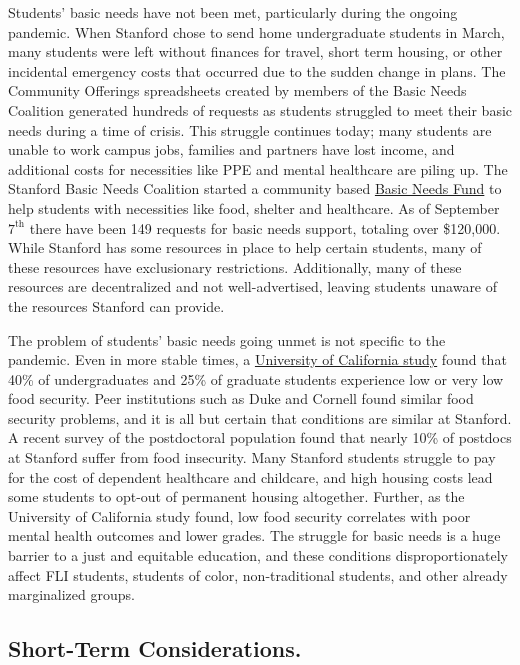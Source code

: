 \documentclass[12pt, titlepage, letterpaper]{article}
\begin{document}
Students’ basic needs have not been met, particularly during the ongoing pandemic. When Stanford chose to send home undergraduate students in March, many students were left without finances for travel, short term housing, or other incidental emergency costs that occurred due to the sudden change in plans. The Community Offerings spreadsheets created by members of the Basic Needs Coalition generated hundreds of requests as students struggled to meet their basic needs during a time of crisis. This struggle continues today; many students are unable to work campus jobs, families and partners have lost income, and additional costs for necessities like PPE and mental healthcare are piling up. The Stanford Basic Needs Coalition started a community based \href{https://basic-needs-stanford.org/}{Basic Needs Fund} to help students with necessities like food, shelter and healthcare. As of September $7^{\mathrm{th}}$ there have been 149 requests for basic needs support, totaling over \$120,000. While Stanford has some resources in place to help certain students, many of these resources have exclusionary restrictions. Additionally, many of these resources are decentralized and not well-advertised, leaving students unaware of the resources Stanford can provide. 

The problem of students’ basic needs going unmet is not specific to the pandemic. Even in more stable times, a \href{https://regents.universityofcalifornia.edu/regmeet/july16/e1attach.pdf}{University of California study} found that 40\% of undergraduates and 25\% of graduate students experience low or very low food security. Peer institutions such as Duke and Cornell found similar food security problems, and it is all but certain that conditions are similar at Stanford. A recent survey of the postdoctoral population found that nearly 10\% of postdocs at Stanford suffer from food insecurity. Many Stanford students struggle to pay for the cost of dependent healthcare and childcare, and high housing costs lead some students to opt-out of permanent housing altogether. Further, as the University of California study found, low food security correlates with poor mental health outcomes and lower grades. The struggle for basic needs is a huge barrier to a just and equitable education, and these conditions disproportionately affect FLI students, students of color, non-traditional students, and other already marginalized groups. 

\subsection*{Short-Term Considerations.}
%
\end{document}
